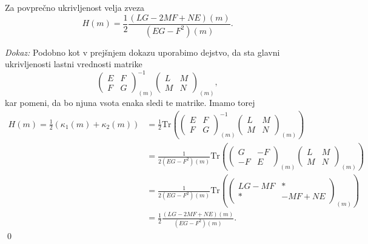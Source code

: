 \begin{izrek}
\label{izr_izrazava_povprecne_ukrivljenosti}
 Za povprečno ukrivljenost velja zveza \begin{equation*}
 H(m) = \frac{1}{2} \frac{(LG - 2MF + NE)(m)}{(EG - F^2)(m)}.
 \end{equation*}  
\end{izrek}
\noindent
{\em Dokaz:\/}
Podobno kot v prejšnjem dokazu uporabimo dejstvo, da sta glavni ukrivljenosti lastni vrednosti matrike \begin{equation*}
  \begin{pmatrix}
    E & F \\
    F & G
    \end{pmatrix}_{(m)}^{-1}\begin{pmatrix}
    L & M \\
    M & N
    \end{pmatrix}_{(m)},
  \end{equation*}  
kar pomeni, da bo njuna vsota enaka sledi te matrike. Imamo torej \begin{align*}
  H(m) = \frac{1}{2}(\kappa_1(m) + \kappa_2(m)) &= \frac{1}{2} \mathrm{Tr} \left( \begin{pmatrix}
    E & F \\
    F & G
    \end{pmatrix}_{(m)}^{-1}\begin{pmatrix}
    L & M \\
    M & N
    \end{pmatrix}_{(m)} \right)   \\
     &= \frac{1}{2(EG - F^2)(m)} \mathrm{Tr} \left(  \begin{pmatrix}
      G & -F \\
      -F & E
      \end{pmatrix}_{(m)} \begin{pmatrix}
      L & M \\
      M & N
      \end{pmatrix}_{(m)} \right) \\
      &=  \frac{1}{2(EG - F^2)(m)} \mathrm{Tr} \left( \begin{pmatrix}
        LG - MF & * \\
        * & -MF + NE
        \end{pmatrix}_{(m)} \right) \\
        &= \frac{1}{2} \frac{(LG - 2MF + NE)(m)}{(EG - F^2)(m)}.
\end{align*}
\qed


